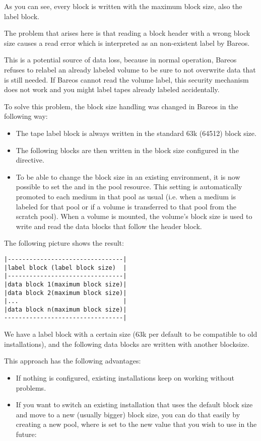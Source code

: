As you can see, every block is written with the maximum block size, also the label block.

The problem that arises here is that reading a block header with a wrong block size causes
a read error which is interpreted as an non-existent label by Bareos.

This is a potential source of data loss, because in normal operation, Bareos refuses to
relabel an already labeled volume to be sure to not overwrite data that is still needed.
If Bareos cannot read the volume label, this security mechanism does not work and you might
label tapes already labeled accidentally.

To solve this problem, the block size handling was changed in Bareos  in the following way:
\begin{itemize}
\item  The tape label block is always written in the standard 63k (64512) block size.
\item  The following blocks are then written in the block size configured in the  directive.
\item  To be able to change the block size in an existing environment, it is now
    possible to set the 
    and
    in the pool resource. This setting is automatically promoted to each medium in
that pool as usual (i.e. when a medium is labeled for that pool or if a volume is transferred to that pool from the scratch pool).
When a volume is mounted, the volume's block size is
used to write and read the data blocks that follow the header block.
\end{itemize}

The following picture shows the result:
\begin{verbatim}
|--------------------------------|
|label block (label block size)  |
|--------------------------------|
|data block 1(maximum block size)|
|data block 2(maximum block size)|
|...                             |
|data block n(maximum block size)|
---------------------------------|
\end{verbatim}
We have a label block with a certain size (63k per default to be compatible to old installations),
and the following data blocks are written with another blocksize.


This approach has the following advantages:
\begin{itemize}
\item If nothing is configured, existing installations keep on working without problems.
\item If you want to switch an existing installation that uses the default
block size and move to a new (usually bigger) block size, you can do that
easily by creating a new pool, where  is set to the new
value that you wish to use in the future:
\end{itemize}


